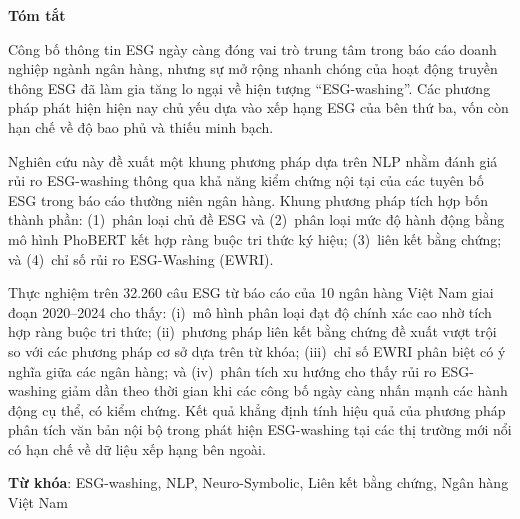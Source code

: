 \begin{center}
\textbf{\large{Tóm tắt}}
\end{center}


\begin{small}

Công bố thông tin ESG ngày càng đóng vai trò trung tâm trong báo cáo doanh nghiệp ngành ngân hàng, nhưng sự mở rộng nhanh chóng của hoạt động truyền thông ESG đã làm gia tăng lo ngại về hiện tượng ``ESG-washing''. Các phương pháp phát hiện hiện nay chủ yếu dựa vào xếp hạng ESG của bên thứ ba, vốn còn hạn chế về độ bao phủ và thiếu minh bạch.

Nghiên cứu này đề xuất một khung phương pháp dựa trên NLP nhằm đánh giá rủi ro ESG-washing thông qua khả năng kiểm chứng nội tại của các tuyên bố ESG trong báo cáo thường niên ngân hàng. Khung phương pháp tích hợp bốn thành phần: (1)~phân loại chủ đề ESG và (2)~phân loại mức độ hành động bằng mô hình PhoBERT kết hợp ràng buộc tri thức ký hiệu; (3)~liên kết bằng chứng; và (4)~chỉ số rủi ro ESG-Washing (EWRI).

Thực nghiệm trên 32.260 câu ESG từ báo cáo của 10 ngân hàng Việt Nam giai đoạn 2020--2024 cho thấy: (i)~mô hình phân loại đạt độ chính xác cao nhờ tích hợp ràng buộc tri thức; (ii)~phương pháp liên kết bằng chứng đề xuất vượt trội so với các phương pháp cơ sở dựa trên từ khóa; (iii)~chỉ số EWRI phân biệt có ý nghĩa giữa các ngân hàng; và (iv)~phân tích xu hướng cho thấy rủi ro ESG-washing giảm dần theo thời gian khi các công bố ngày càng nhấn mạnh các hành động cụ thể, có kiểm chứng. Kết quả khẳng định tính hiệu quả của phương pháp phân tích văn bản nội bộ trong phát hiện ESG-washing tại các thị trường mới nổi có hạn chế về dữ liệu xếp hạng bên ngoài.

\vspace*{1cm}
\textbf{Từ khóa}: ESG-washing, NLP, Neuro-Symbolic, Liên kết bằng chứng, Ngân hàng Việt Nam

\end{small}